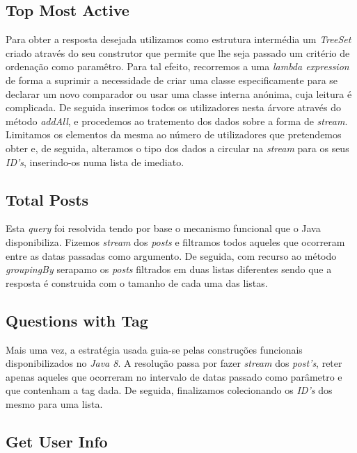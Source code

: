 \documentclass[a4paper, 11pt, oneside]{article}
\begin{document}
\subsection{Top Most Active}

Para obter a resposta desejada utilizamos como estrutura intermédia um \textit{TreeSet} criado através do seu construtor que permite que lhe seja passado um critério de ordenação como paramêtro. Para tal efeito, recorremos a uma \textit{lambda expression} de forma a suprimir a necessidade de criar uma classe especificamente para se declarar um novo comparador ou usar uma classe interna anónima, cuja leitura é complicada. De seguida inserimos todos os utilizadores nesta árvore através do método \textit{addAll}, e procedemos ao tratemento dos dados sobre a forma de \textit{stream}. Limitamos os elementos da mesma ao número de utilizadores que pretendemos obter e, de seguida, alteramos o tipo dos dados a circular na \textit{stream} para os seus \textit{ID's}, inserindo-os numa lista de imediato.



\subsection{Total Posts}

Esta \textit{query} foi resolvida tendo por base o mecanismo funcional que o Java disponibiliza. Fizemos \textit{stream} dos \textit{posts} e filtramos todos aqueles que ocorreram entre as datas passadas como argumento. De seguida, com recurso ao método \textit{groupingBy} serapamo os \textit{posts} filtrados em duas listas diferentes sendo que a resposta é construida com o tamanho de cada uma das listas.


\subsection{Questions with Tag}

Mais uma vez, a estratégia usada guia-se pelas construções funcionais disponibilizados no \textit{Java 8}. A resolução passa por fazer \textit{stream} dos \textit{post's}, reter apenas aqueles que ocorreram no intervalo de datas passado como parâmetro e que contenham a tag dada. De seguida, finalizamos colecionando os \textit{ID's} dos mesmo para uma lista.


\subsection{Get User Info}
\end{document}
